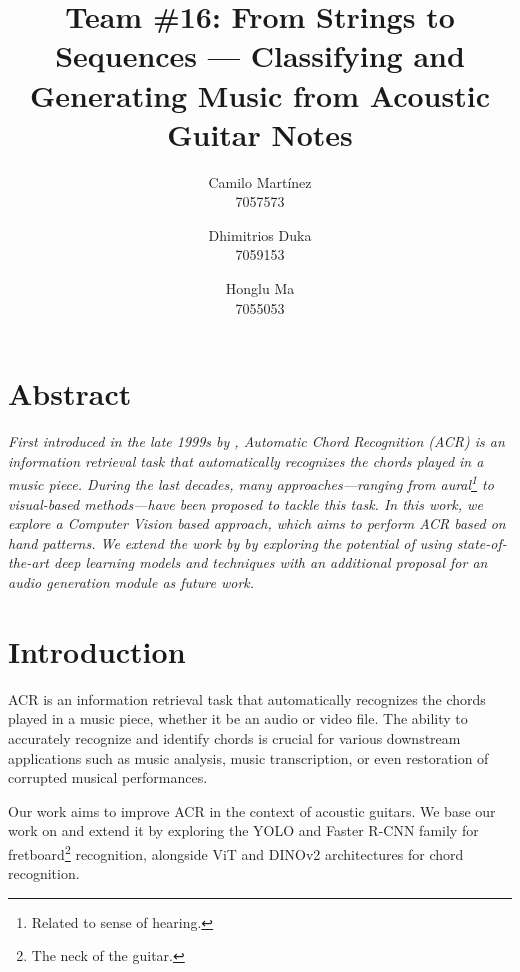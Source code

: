 \documentclass[10pt,twocolumn,letterpaper]{article}
\begin{document}
\newcommand{\dhimitrios}[1]{\textcolor{red}{Dhimitrios: #1}}

\title{Team \#16: From Strings to Sequences --- Classifying and Generating Music from Acoustic Guitar Notes}


\author{
    Camilo Martínez\\
    7057573\\
    \and
    Dhimitrios Duka\\
    7059153\\
    \and
    Honglu Ma\\
    7055053\\
}
\maketitle

\section{Abstract}
\emph{First introduced in the late 1999s by \cite{takuya1999realtime}, Automatic Chord Recognition (ACR) is an information retrieval task that automatically recognizes the chords played in a music piece. During the last decades, many approaches—ranging from aural\footnote{Related to sense of hearing.} to visual-based methods—have been proposed to tackle this task. In this work, we explore a Computer Vision based approach, which aims to perform ACR based on hand patterns. We extend the work by \cite{Kristian_Zaman_Tenoyo_Jodhinata_2024} by exploring the potential of using state-of-the-art deep learning models and techniques with an additional proposal for an audio generation module as future work.}

\section{Introduction}
ACR is an information retrieval task that automatically recognizes the chords played in a music piece, whether it be an audio or video file. The ability to accurately recognize and identify chords is crucial for various downstream applications such as music analysis, music transcription, or even restoration of corrupted musical performances.

Our work aims to improve ACR in the context of acoustic guitars. We base our work on \cite{Kristian_Zaman_Tenoyo_Jodhinata_2024} and extend it by exploring the YOLO \cite{redmon2016you} and Faster R-CNN \cite{ren2016faster} family for fretboard\footnote{The neck of the guitar.} recognition, alongside ViT \cite{dosovitskiy2020image} and DINOv2 \cite{oquab2023dinov2} architectures for chord recognition.
\end{document}
